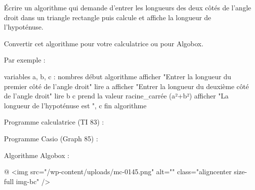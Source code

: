 
%
Écrire un algorithme qui demande d'entrer les longueurs des deux côtés de l'angle droit dans un triangle rectangle puis calcule et affiche la longueur de l'hypoténuse.
\par
Convertir cet algorithme pour votre calculatrice ou pour Algobox.
\begin{corrige}
     Par exemple :
\begin{code}
variables
   a, b, c : nombres
début algorithme
   afficher "Entrer la longueur du premier côté de l'angle droit"
   lire a
   afficher "Entrer la longueur du deuxième côté de l'angle droit"
   lire b
   c prend la valeur racine_carrée (a²+b²)
   afficher "La longueur de l'hypoténuse est ", c
fin algorithme
\end{code}
     Programme calculatrice (TI 83) :
\begin{center}
\end{center}
     Programme Casio (Graph 85) :
\begin{center}
\end{center}
     Algorithme Algobox :

\begin{center}

\end{center}@
     <img src="/wp-content/uploads/mc-0145.png" alt="" class="aligncenter size-full  img-bc" />
\end{corrige}
